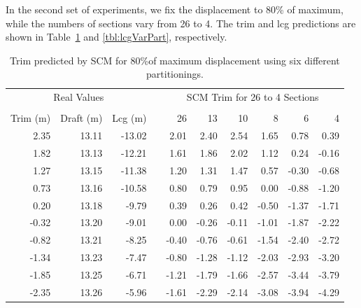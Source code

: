 \documentclass[runningheads]{llncs}
\begin{document}
In the second set of experiments, we fix the displacement to 80\% of maximum, while the numbers of sections vary from 26 to 4. The trim and lcg predictions are shown in Table~\ref{tbl:trimVarPart} and \ref{tbl:lcgVarPart}, respectively.
\begin{table}[h!]
\begin{tabular}{rrrc@{\:\:\:\:}r@{\:\:\:\:}r@{\:\:\:\:}r@{\:\:\:\:}r@{\:\:\:\:}r@{\:\:\:\:}r}
\multicolumn{3}{c}{Real Values}& &\multicolumn{6}{c}{SCM Trim for 26 to 4 Sections}\\[0.1ex] \cline{1-3} \cline{5-10}
\\[-1.5ex]
Trim (m)       & Draft (m)   & Lcg (m) &      & 26        &13        &10        &8          &6          &4\\
\hline \rule{0pt}{3ex}
2.35        &13.11  &-13.02 && 2.01   &2.40    &2.54    &1.65    &0.78    &0.39\\
1.82        &13.13  &-12.21 && 1.61 &1.86           &2.02    &1.12    &0.24    &-0.16\\
1.27        &13.15  &-11.38 && 1.20 &1.31       &1.47    &0.57    &-0.30   &-0.68\\
0.73        &13.16  &-10.58 && 0.80 &0.79           &0.95    &0.00    &-0.88   &-1.20\\
0.20        &13.18  &-9.79  && 0.39 &0.26       &0.42    &-0.50   &-1.37   &-1.71\\
-0.32      &13.20  &-9.01   && 0.00 &-0.26     &-0.11   &-1.01   &-1.87   &-2.22\\
-0.82      &13.21  &-8.25   && -0.40 &-0.76   &-0.61   &-1.54   &-2.40   &-2.72\\
-1.34      &13.23  &-7.47   && -0.80 &-1.28        &-1.12   &-2.03   &-2.93   &-3.20\\
-1.85      &13.25  &-6.71   && -1.21 &-1.79        &-1.66   &-2.57   &-3.44   &-3.79\\
-2.35      &13.26  &-5.96   && -1.61 &-2.29   &-2.14   &-3.08   &-3.94   &-4.29\\
\end{tabular}
\caption{Trim predicted by SCM for 80\%of maximum displacement using six different partitionings.}
\label{tbl:trimVarPart}
\end{table}
\end{document}

